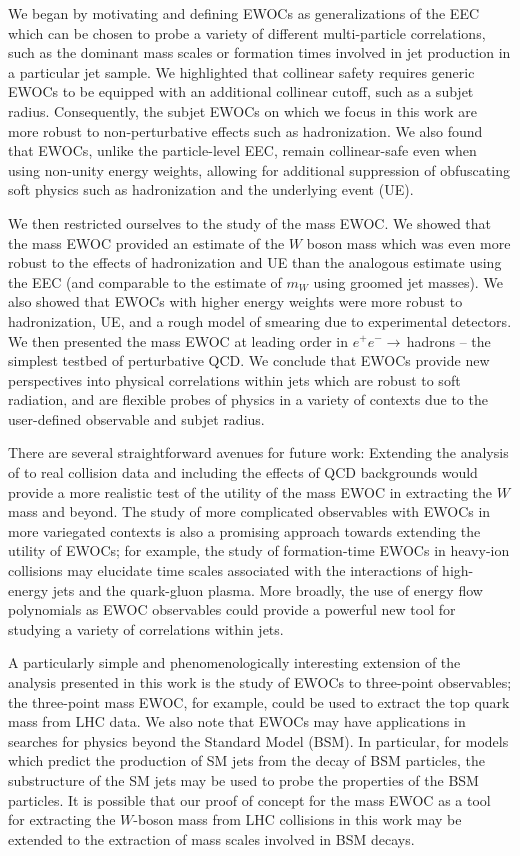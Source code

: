 We began by motivating and defining EWOCs as generalizations of the EEC which can be chosen to probe a variety of different multi-particle correlations, such as the dominant mass scales or formation times involved in jet production in a particular jet sample.
%
We highlighted that collinear safety requires generic EWOCs to be equipped with an additional collinear cutoff, such as a subjet radius.
%
Consequently, the subjet EWOCs on which we focus in this work are more robust to non-perturbative effects such as hadronization.
%
We also found that EWOCs, unlike the particle-level EEC, remain collinear-safe even when using non-unity energy weights, allowing for additional suppression of obfuscating soft physics such as hadronization and the underlying event (UE).

We then restricted ourselves to the study of the mass EWOC.
%
We showed that the mass EWOC provided an estimate of the \(W\) boson mass which was even more robust to the effects of hadronization and UE than the analogous estimate using the EEC (and comparable to the estimate of \(m_W\) using groomed jet masses).
%
We also showed that EWOCs with higher energy weights were more robust to hadronization, UE, and a rough model of smearing due to experimental detectors.
%
We then presented the mass EWOC at leading order in \(e^+ e^- \to\,\)hadrons -- the simplest testbed of perturbative QCD.
%
We conclude that EWOCs provide new perspectives into physical correlations within jets which are robust to soft radiation, and are flexible probes of physics in a variety of contexts due to the user-defined observable and subjet radius.

There are several straightforward avenues for future work:
%
Extending the analysis of  to real collision data and including the effects of QCD backgrounds would provide a more realistic test of the utility of the mass EWOC in extracting the \(W\) mass and beyond.
%
The study of more complicated observables with EWOCs in more variegated contexts is also a promising approach towards extending the utility of EWOCs;
%
for example, the study of formation-time EWOCs in heavy-ion collisions may elucidate time scales associated with the interactions of high-energy jets and the quark-gluon plasma.
%
More broadly, the use of energy flow polynomials \cite{Komiske:2017aww} as EWOC observables could provide a powerful new tool for studying a variety of correlations within jets.

A particularly simple and phenomenologically interesting extension of the analysis presented in this work is the study of EWOCs to three-point observables;
%
the three-point mass EWOC, for example, could be used to extract the top quark mass from LHC data.
%
We also note that EWOCs may have applications in searches for physics beyond the Standard Model (BSM).
%
In particular, for models which predict the production of SM jets from the decay of BSM particles, the substructure of the SM jets may be used to probe the properties of the BSM particles.
%
It is possible that our proof of concept for the mass EWOC as a tool for extracting the \(W\)-boson mass from LHC collisions in this work may be extended to the extraction of mass scales involved in BSM decays.

